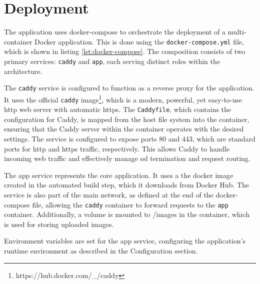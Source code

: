 \section{Deployment}
\label{sec:deployment}


The application uses docker-compose to orchestrate the deployment of a multi-container Docker application. This is done using the \texttt{docker-compose.yml} file\cite{docker-compose}, which is shown in listing \ref{lst:docker-compose}. The composition consists of two primary services: \texttt{caddy} and \texttt{app}, each serving distinct roles within the architecture.

The \texttt{caddy} service is configured to function as a reverse proxy for the application. It uses the official \texttt{caddy} image\footnote{https://hub.docker.com/\_/caddy}, which is a modern, powerful, yet easy-to-use \acrshort{http} web server with automatic \acrshort{https}.\cite{auto-https} The \texttt{Caddyfile}, which contains the configuration for Caddy, is mapped from the host file system into the container, ensuring that the Caddy server within the container operates with the desired settings. The service is configured to expose ports 80 and 443, which are standard ports for \acrshort{http} and \acrshort{https} traffic, respectively. This allows Caddy to handle incoming web traffic and effectively manage \acrfull{ssl} termination and request routing.

The app service represents the core application. It uses a the docker image created in the automated build step, which it downloads from Docker Hub. The service is also part of the main network, as defined at the end of the docker-compose file, allowing the \texttt{caddy} container to forward requests to the \texttt{app} container. Additionally, a volume is mounted to /images in the container, which is used for storing uploaded images.

Environment variables are set for the app service, configuring the application's runtime environment as described in the Configuration section.


